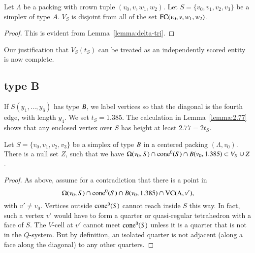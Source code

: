 \begin{lemma}
Let $\Lambda$ be a packing with crown tuple $(v_0,v,w_1,w_2)$.
Let $S=\{v_0,v_1,v_2,v_3\}$ be a simplex of type $A$.
  $V_S$ is disjoint from all of the set ${\operatorname{FC}}(v_0,v,w_1,w_2)$.
\end{lemma}

\begin{proof}
This is evident from
Lemma~\ref{lemma:delta-tri}. %
\end{proof}


Our justification that $V_S(t_S)$ can be treated as an
independently scored entity is now complete.

\subsection{type B}%

If $S(y_1,\ldots,y_6)$ has type $B$, we label vertices so that
the diagonal is the fourth edge, with length $y_4$. We set
$t_S=1.385$. The calculation in Lemma~\ref{lemma:2.77}
shows that any enclosed vertex over $S$ has height at least
$2.77=2t_S$.

\begin{lemma} 
Let $S=\{v_0,v_1,v_2,v_3\}$ be a simplex of type $B$ in a centered packing $(\Lambda,v_0)$.
There is a null set $Z$, such that
we have  $ \Omega(v_0,S) \cap {\operatorname{cone}}^0(S) \cap B(v_0,1.385) 
\subset V_S \cup Z$.
\end{lemma}

\begin{proof}  As above, assume for a contradiction that there
is a point in 
 $$\Omega(v_0,S)\cap {\operatorname{cone}}^0(S) \cap B(v_0,1.385)\cap {\operatorname{VC}}(\Lambda,v'),$$
with $v'\ne v_0$.
Vertices outside ${\operatorname{cone}}^0(S)$ cannot reach inside $S$ this way.  In
fact, such a vertex $v'$ would have to form a quarter or
quasi-regular tetrahedron with a face of $S$.  The $V$-cell at
$v'$ cannot meet ${\operatorname{cone}}^0(S)$ unless it is a quarter that is not in the
$Q$-system. But by definition, an isolated quarter is not adjacent
(along a face along the diagonal) to any other quarters.
\end{proof}



